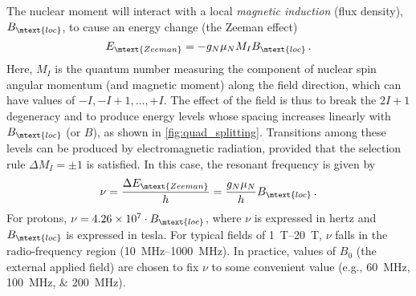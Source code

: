 \documentclass[nobib,nofonts,nols,nohyper]{tufte-handout}
\begin{document}
The nuclear moment will interact with a local \emph{magnetic induction} (flux density), 
\( B_\mtext{loc} \), to cause an energy change (the Zeeman effect)
\begin{equation}
	E_\mtext{Zeeman} = -g_N \mu_N M_I B_\mtext{loc} \, .
	\label{eq:zeeman_energy}
\end{equation}
Here, \( M_I \) is the quantum number measuring the component of nuclear spin angular momentum (and magnetic moment) along the field direction, which can have values of \( -I, -I+1, \ldots, +I \). 
The effect of the field is thus to break the \( 2I + 1 \) degeneracy and to produce energy levels whose spacing increases linearly with \( B_\mtext{loc} \) (or \( B \)), as shown in \cref{fig:quad_splitting}. 
Transitions among these levels can be produced by electromagnetic radiation, provided that the selection rule \( \Delta M_I = \pm 1 \) is satisfied. 
In this case, the resonant frequency is given by 
\begin{equation}
	\nu = \frac{\Delta E_\mtext{Zeeman}}{h} = \frac{g_N\mu_N}{h} B_\mtext{loc}\, .
	\label{eq:res_freq}
\end{equation}
For protons, \( \nu = \num{4.26e7} \cdot B_\mtext{loc} \), where \( \nu \) is expressed in hertz and \( B_\mtext{loc} \) is expressed in tesla. For typical fields of \SIrange{1}{20}{\tesla}, \( \nu \) falls in the radio-frequency region (\SIrange{10}{1000}{\MHz}). 
In practice, values of \( B_0 \) (the external applied field) are chosen to fix \( \nu \) to some convenient value (e.g., \SIlist{60;100;200}{\MHz}). 

\end{document}
